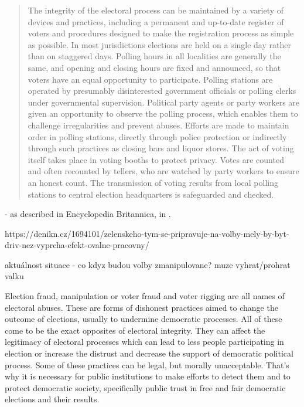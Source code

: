 \begin{quote}
    The integrity of the electoral process can be maintained by a variety of devices and practices, including a permanent and up-to-date register of voters and procedures designed to make the registration process as simple as possible. In most jurisdictions elections are held on a single day rather than on staggered days. Polling hours in all localities are generally the same, and opening and closing hours are fixed and announced, so that voters have an equal opportunity to participate. Polling stations are operated by presumably disinterested government officials or polling clerks under governmental supervision. Political party agents or party workers are given an opportunity to observe the polling process, which enables them to challenge irregularities and prevent abuses. Efforts are made to maintain order in polling stations, directly through police protection or indirectly through such practices as closing bars and liquor stores. The act of voting itself takes place in voting booths to protect privacy. Votes are counted and often recounted by tellers, who are watched by party workers to ensure an honest count. The transmission of voting results from local polling stations to central election headquarters is safeguarded and checked.
\end{quote}

  \begin{flushright}
  - as described in Encyclopedia Britannica, in \citeyear{election}. 
  \end{flushright}

\begin{koment}
https://denikn.cz/1694101/zelenskeho-tym-se-pripravuje-na-volby-mely-by-byt-driv-nez-vyprcha-efekt-ovalne-pracovny/

aktuálnost situace - co kdyz budou volby zmanipulovane? muze vyhrat/prohrat valku 

\end{koment}


Election fraud, manipulation or voter fraud and voter rigging are all names of electoral abuses. These are forms of dishonest practices aimed to change the outcome of elections, usually to undermine democratic processes. All of these come to be the exact opposites of electoral integrity. They can affect the legitimacy of electoral processes which can lead to less people participating in election or increase the distrust and decrease the support of democratic political process. Some of these practices can be legal, but morally unacceptable. That's why it is necessary for public institutions to make efforts to detect them and to protect democratic society, specifically public trust in free and fair democratic elections and their results. \cite{Lehoucq2003, Levitt2007, election, Lebeda2021}

